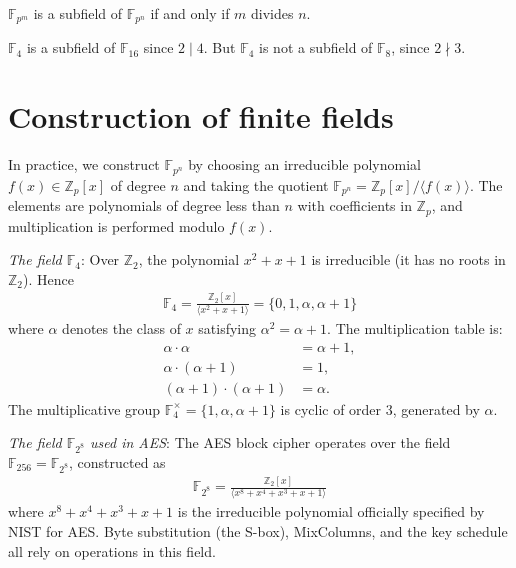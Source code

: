 \documentclass[a4paper, 12pt]{book} %
\begin{document}
\begin{theorem}
    $\mathbb{F}_{p^m}$ is a subfield of $\mathbb{F}_{p^n}$ if and only if $m$ divides $n$.
\end{theorem}

\begin{example}
    $\mathbb{F}_4$ is a subfield of $\mathbb{F}_{16}$ since $2 \mid 4$. But $\mathbb{F}_4$ is not a subfield of $\mathbb{F}_8$, since $2 \nmid 3$.
\end{example}

\section{Construction of finite fields}

In practice, we construct $\mathbb{F}_{p^n}$ by choosing an irreducible polynomial
$f(x) \in \mathbb{Z}_p[x]$ of degree $n$ and taking the quotient
$\mathbb{F}_{p^n} = \mathbb{Z}_p[x] / \langle f(x) \rangle$. The elements are
polynomials of degree less than $n$ with coefficients in $\mathbb{Z}_p$, and
multiplication is performed modulo $f(x)$.

\begin{example}
    \emph{The field $\mathbb{F}_4$}: Over $\mathbb{Z}_2$, the polynomial $x^2 + x + 1$ is irreducible (it has no roots in $\mathbb{Z}_2$). Hence
    \begin{align}
        \mathbb{F}_4 = \frac{\mathbb{Z}_2[x]}{\langle x^2 + x + 1 \rangle} = \{0, 1, \alpha, \alpha + 1\}
    \end{align}
    where $\alpha$ denotes the class of $x$ satisfying $\alpha^2 = \alpha + 1$. The multiplication table is:
    \begin{align}
        \alpha \cdot \alpha &= \alpha + 1, \\
        \alpha \cdot (\alpha + 1) &= 1, \\
        (\alpha + 1) \cdot (\alpha + 1) &= \alpha.
    \end{align}
    The multiplicative group $\mathbb{F}_4^\times = \{1, \alpha, \alpha+1\}$ is cyclic of order $3$, generated by $\alpha$.
\end{example}

\begin{example}
    \emph{The field $\mathbb{F}_{2^8}$ used in AES}: The AES block cipher operates over the field $\mathbb{F}_{256} = \mathbb{F}_{2^8}$, constructed as
    \begin{align}
        \mathbb{F}_{2^8} = \frac{\mathbb{Z}_2[x]}{\langle x^8 + x^4 + x^3 + x + 1 \rangle}
    \end{align}
    where $x^8 + x^4 + x^3 + x + 1$ is the irreducible polynomial officially specified by NIST for AES. Byte substitution (the S-box), MixColumns, and the key schedule all rely on operations in this field.
\end{example}
\end{document}
